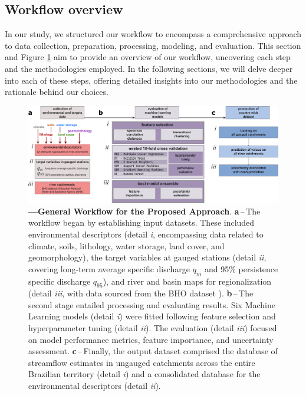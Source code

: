 \documentclass[12pt]{article}
\begin{document}
\subsection{Workflow overview}

\par In our study, we structured our workflow to encompass a comprehensive approach to data collection, preparation, processing, modeling, and evaluation. This section and Figure \ref{fig:methods} aim to provide an overview of our workflow, uncovering each step and the methodologies employed. In the following sections, we will delve deeper into each of these steps, offering detailed insights into our methodologies and the rationale behind our choices.

\begin{figure}[t!] %
	\centering                                       
	\includegraphics[width=0.98\linewidth]{figs/01_overview.png}    
	\caption[General methodology framework]
	{\textbf{---\;General Workflow for the Proposed Approach}. 
		\textbf{a}\,--\,The workflow began by establishing input datasets. These included environmental descriptors (detail \textrm{\textit{i}}, encompassing data related to climate, soils, lithology, water storage, land cover, and geomorphology), the target variables at gauged stations (detail \textrm{\textit{ii}}, covering long-term average specific discharge $q_m$ and 95\% persistence specific discharge $q_{95}$), and river and basin maps for regionalization (detail \textrm{\textit{iii}}, with data sourced from the BHO dataset \cite{ana2017}).
		\textbf{b}\,--\,The second stage entailed processing and evaluating results. Six Machine Learning models (detail \textrm{\textit{i}}) were fitted following feature selection and hyperparameter tuning (detail \textrm{\textit{ii}}). The evaluation (detail \textrm{\textit{iii}}) focused on model performance metrics, feature importance, and uncertainty assessment.	
        \textbf{c}\,--\,Finally, the output dataset comprised the database of streamflow estimates in ungauged catchments across the entire Brazilian territory (detail \textrm{\textit{i}}) and a consolidated database for the environmental descriptors (detail \textrm{\textit{ii}}).	
	}
	\label{fig:methods}  %
\end{figure}
\end{document}
